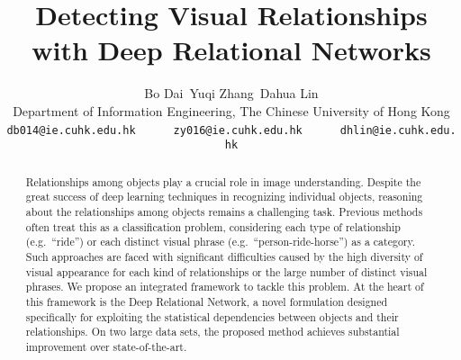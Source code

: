 \documentclass[10pt,twocolumn,letterpaper]{article}
\begin{document}
\title{Detecting Visual Relationships with Deep Relational Networks}

\author{Bo Dai\qquad\qquad~Yuqi Zhang\qquad\qquad~Dahua Lin\\
Department of Information Engineering, The Chinese University of Hong Kong\\
{\footnotesize\texttt{db014@ie.cuhk.edu.hk}~~~~~~\texttt{zy016@ie.cuhk.edu.hk}~~~~~~\texttt{dhlin@ie.cuhk.edu.hk}}
}

\maketitle
\begin{abstract}
Relationships among objects play a crucial role in image understanding.
Despite the great success of deep learning techniques in recognizing 
individual objects, reasoning about the relationships among objects
remains a challenging task.
Previous methods often treat this as a classification problem,
considering each type of relationship (e.g.~``ride'') or each distinct
visual phrase (e.g.~``person-ride-horse'') as a category.
Such approaches are faced with significant difficulties caused by
the high diversity of visual appearance for each kind of relationships
or the large number of distinct visual phrases. 
We propose an integrated framework to tackle this problem.
At the heart of this framework is the Deep Relational Network,
a novel formulation designed specifically for exploiting the 
statistical dependencies between objects and their relationships. 
On two large data sets, the proposed method achieves substantial 
improvement over state-of-the-art. 
\end{abstract}
\end{document}
